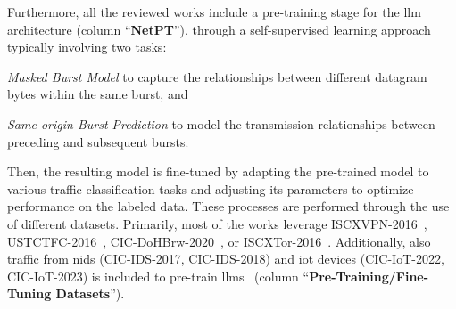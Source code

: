 Furthermore, all the reviewed works include a pre-training stage for the \gls{llm} architecture (column ``\textbf{NetPT}''), through a self-supervised learning approach typically involving two tasks:
\begin{enumerate*}[label=(\emph{\alph*})]
    \item \emph{Masked Burst Model} to capture the relationships between different datagram bytes within the same burst, and
    \item \emph{Same-origin Burst Prediction} to model the transmission relationships between preceding and subsequent bursts. 
\end{enumerate*}
Then, the resulting model is fine-tuned by adapting the pre-trained model to various traffic classification tasks and adjusting its parameters to optimize performance on the labeled data.
These processes are performed through the use of different datasets. Primarily, most of the works leverage ISCXVPN-2016~\cite{lin2022, meng2023netgpt,wang2024lens, qu2024trafficgpt, wang2024netmamba, tao2024lambert}, USTCTFC-2016~\cite{meng2023netgpt, qu2024trafficgpt,wang2024netmamba}, CIC-DoHBrw-2020~\cite{meng2023netgpt, wang2024lens, qu2024trafficgpt}, or ISCXTor-2016~\cite{wang2024lens, qu2024trafficgpt, wang2024netmamba}.
Additionally, also traffic from \gls{nids} (\eg CIC-IDS-2017, CIC-IDS-2018) and \gls{iot} devices (\eg CIC-IoT-2022, CIC-IoT-2023) is included to pre-train \glspl{llm}~\cite{lin2022, wang2024lens, qu2024trafficgpt, wang2024netmamba, tao2024lambert} (column ``\textbf{Pre-Training/Fine-Tuning Datasets}'').

